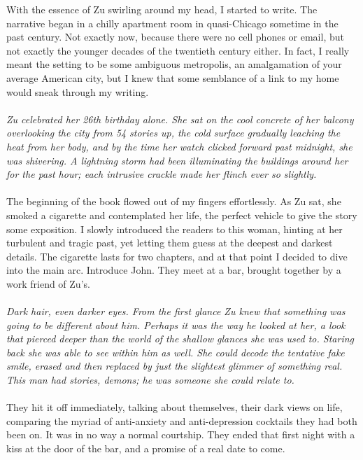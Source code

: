 With the essence of Zu swirling around my head, I started to write. The narrative began in a chilly apartment room in quasi-Chicago sometime in the past century. Not exactly now, because there were no cell phones or email, but not exactly the younger decades of the twentieth century either.  In fact, I really meant the setting to be some ambiguous metropolis, an amalgamation of your average American city, but I knew that some semblance of a link to my home would sneak through my writing.
\\\\
\textit{Zu celebrated her 26th birthday alone. She sat on the cool concrete of her balcony overlooking the city from 54 stories up, the cold surface gradually leaching the heat from her body, and by the time her watch clicked forward past midnight, she was shivering. A lightning storm had been illuminating the buildings around her for the past hour; each intrusive crackle made her flinch ever so slightly.}
\\\\
	The beginning of the book flowed out of my fingers effortlessly. As Zu sat, she smoked a cigarette and contemplated her life, the perfect vehicle to give the story some exposition. I slowly introduced the readers to this woman, hinting at her turbulent and tragic past, yet letting them guess at the deepest and darkest details. The cigarette lasts for two chapters, and at that point I decided to dive into the main arc. Introduce John. They meet at a bar, brought together by a work friend of Zu’s.
\\\\	
\textit{	Dark hair, even darker eyes. From the first glance Zu knew that something was going to be different about him. Perhaps it was the way he looked at her, a look that pierced deeper than the world of the shallow glances she was used to. Staring back she was able to see within him as well. She could decode the tentative fake smile, erased and then replaced by just the slightest glimmer of something real. This man had stories, demons; he was someone she could relate to.}
\\\\	
	They hit it off immediately, talking about themselves, their dark views on life, comparing the myriad of anti-anxiety and anti-depression cocktails they had both been on. It was in no way a normal courtship. They ended that first night with a kiss at the door of the bar, and a promise of a real date to come. 
\\\\	
